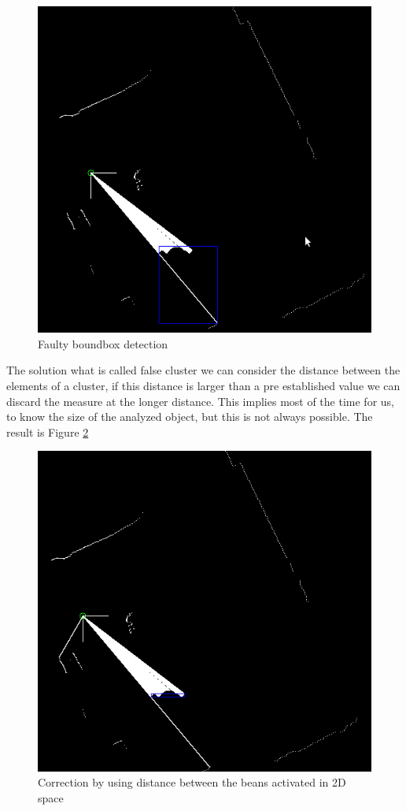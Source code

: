 \documentclass{article}
\begin{document}
\begin{figure}[H]
\includegraphics[scale=0.4]{image/boundbox02}
\caption{Faulty boundbox detection}
\label{fig:boundbox02}
\end{figure}


The solution what is called false cluster we can consider the distance between the elements of a cluster, if this distance is larger than a pre established value we can discard the measure at the longer distance. This implies most of the time for us, to know the size of the analyzed object, but this is not always possible. The result is Figure \ref{fig:boundbox03}

\begin{figure}[H]
\includegraphics[scale=0.4]{image/boundbox03}
\caption{Correction by using distance between the beans activated in 2D space}
\label{fig:boundbox03}
\end{figure}
\end{document}
